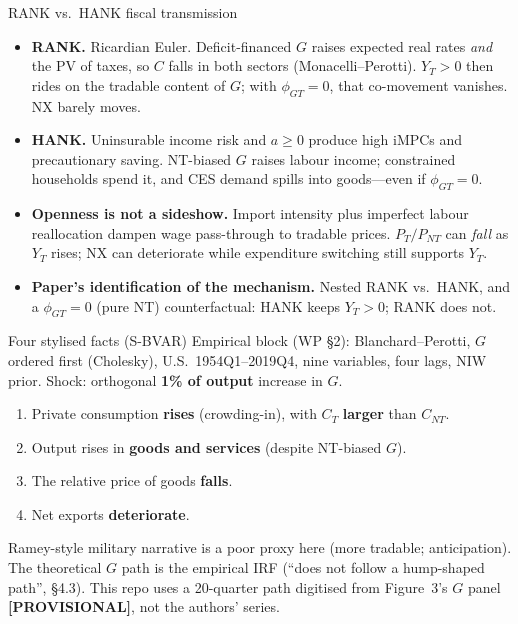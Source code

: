 \documentclass[11pt,aspectratio=169]{beamer}
\begin{document}
\begin{frame}{RANK vs.\ HANK fiscal transmission}
  \begin{itemize}
    \item \textbf{RANK.}
          Ricardian Euler. Deficit-financed $G$ raises expected real rates
          \emph{and} the PV of taxes, so $C$ falls in both sectors
          (Monacelli--Perotti). $Y_T>0$ then rides on the tradable content
          of $G$; with $\phi_{GT}=0$, that co-movement vanishes. NX barely
          moves.
    \item \textbf{HANK.}
          Uninsurable income risk and $a\ge 0$ produce high iMPCs and
          precautionary saving. NT-biased $G$ raises labour income; constrained
          households spend it, and CES demand spills into goods---even if
          $\phi_{GT}=0$.
    \item \textbf{Openness is not a sideshow.}
          Import intensity plus imperfect labour reallocation dampen wage
          pass-through to tradable prices. $P_T/P_{NT}$ can \emph{fall} as
          $Y_T$ rises; NX can deteriorate while expenditure switching still
          supports $Y_T$.
    \item \textbf{Paper's identification of the mechanism.}
          Nested RANK vs.\ HANK, and a $\phi_{GT}=0$ (pure NT) counterfactual:
          HANK keeps $Y_T>0$; RANK does not.
  \end{itemize}
\end{frame}

\begin{frame}{Four stylised facts (S-BVAR)}
  Empirical block (WP \S2): Blanchard--Perotti, $G$ ordered first (Cholesky),
  U.S.\ 1954Q1--2019Q4, nine variables, four lags, NIW prior.
  Shock: orthogonal \textbf{1\% of output} increase in $G$.
  \begin{enumerate}
    \item Private consumption \textbf{rises} (crowding-in), with
          $C_T$ \textbf{larger} than $C_{NT}$.
    \item Output rises in \textbf{goods and services} (despite NT-biased $G$).
    \item The relative price of goods \textbf{falls}.
    \item Net exports \textbf{deteriorate}.
  \end{enumerate}
  \vspace{0.35em}
  {\footnotesize
  Ramey-style military narrative is a poor proxy here (more tradable; anticipation).
  The theoretical $G$ path is the empirical IRF (``does not follow a hump-shaped
  path'', \S4.3). This repo uses a 20-quarter path digitised from Figure~3's
  $G$ panel \textbf{[PROVISIONAL]}, not the authors' series.}
\end{frame}
\end{document}
